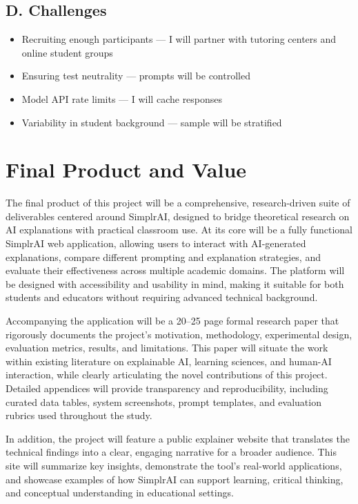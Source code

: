 \documentclass[11pt]{article}
\begin{document}
\subsection*{D. Challenges}

\begin{itemize}[leftmargin=1.6em]
  \item Recruiting enough participants --- I will partner with tutoring centers
  and online student groups
  \item Ensuring test neutrality --- prompts will be controlled
  \item Model API rate limits --- I will cache responses
  \item Variability in student background --- sample will be stratified
\end{itemize}

\section*{Final Product and Value}

The final product of this project will be a comprehensive, research-driven suite
of deliverables centered around SimplrAI, designed to bridge theoretical
research on AI explanations with practical classroom use. At its core will be a
fully functional SimplrAI web application, allowing users to interact with
AI-generated explanations, compare different prompting and explanation
strategies, and evaluate their effectiveness across multiple academic domains.
The platform will be designed with accessibility and usability in mind, making
it suitable for both students and educators without requiring advanced technical
background.

Accompanying the application will be a 20--25 page formal research paper that
rigorously documents the project's motivation, methodology, experimental design,
evaluation metrics, results, and limitations. This paper will situate the work
within existing literature on explainable AI, learning sciences, and human-AI
interaction, while clearly articulating the novel contributions of this project.
Detailed appendices will provide transparency and reproducibility, including
curated data tables, system screenshots, prompt templates, and evaluation
rubrics used throughout the study.

In addition, the project will feature a public explainer website that translates
the technical findings into a clear, engaging narrative for a broader audience.
This site will summarize key insights, demonstrate the tool's real-world
applications, and showcase examples of how SimplrAI can support learning,
critical thinking, and conceptual understanding in educational settings.
\end{document}
